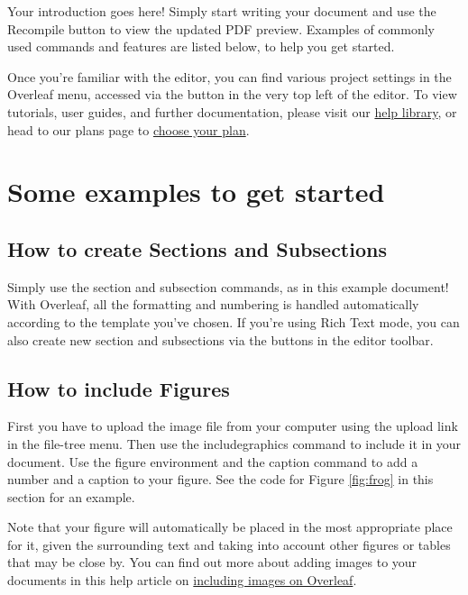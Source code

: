 ﻿\documentclass{article}
\begin{document}
    Your introduction goes here! Simply start writing your document and use the Recompile button to view the updated PDF preview. Examples of commonly used commands and features are listed below, to help you get started.

    Once you're familiar with the editor, you can find various project settings in the Overleaf menu, accessed via the button in the very top left of the editor. To view tutorials, user guides, and further documentation, please visit our \href{https://www.overleaf.com/learn}{help library}, or head to our plans page to \href{https://www.overleaf.com/user/subscription/plans}{choose your plan}.


    \section{Some examples to get started}

    \subsection{How to create Sections and Subsections}

    Simply use the section and subsection commands, as in this example document! With Overleaf, all the formatting and numbering is handled automatically according to the template you've chosen. If you're using Rich Text mode, you can also create new section and subsections via the buttons in the editor toolbar.

    \subsection{How to include Figures}

    First you have to upload the image file from your computer using the upload link in the file-tree menu. Then use the includegraphics command to include it in your document. Use the figure environment and the caption command to add a number and a caption to your figure. See the code for Figure \ref{fig:frog} in this section for an example.

    Note that your figure will automatically be placed in the most appropriate place for it, given the surrounding text and taking into account other figures or tables that may be close by. You can find out more about adding images to your documents in this help article on \href{https://www.overleaf.com/learn/how-to/Including_images_on_Overleaf}{including images on Overleaf}.
\end{document}
